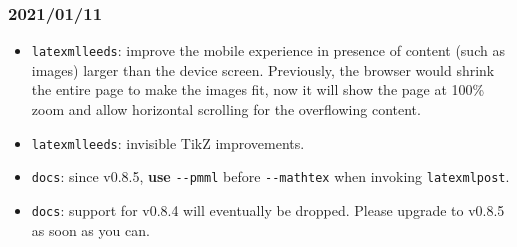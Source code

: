 \documentclass[a4paper]{article}
\theoremstyle{definition}
\begin{document}
\subsubsection*{2021/01/11}
\begin{itemize}
  \item \verb|latexmlleeds|: improve the mobile experience in presence of content (such as images) larger than the device screen. Previously, the browser would shrink the entire page to make the images fit, now it will show the page at 100\% zoom and allow horizontal scrolling for the overflowing content.
  \item \verb|latexmlleeds|: invisible TikZ improvements.
  \item \verb|docs|: since \LaTeXML{} v0.8.5, \textbf{use} \verb|--pmml| before \verb|--mathtex| when invoking \verb|latexmlpost|.
  \item \verb|docs|: support for \LaTeXML{} v0.8.4 will eventually be dropped. Please upgrade to v0.8.5 as soon as you can.
\end{itemize}

\tableofcontents
\end{document}
